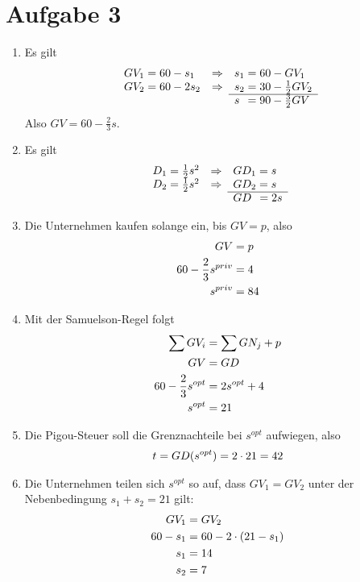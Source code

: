 \documentclass{article}
\begin{document}
	\section*{Aufgabe 3}
	\begin{enumerate}[label=(\alph*)]
		\item Es gilt
		\begin{align}
			\begin{array}{lcl}
				GV_1 = 60-s_1 & \Rightarrow & s_1 = 60-GV_1 \\
				GV_2 = 60-2s_2 & \Rightarrow & s_2 = 30 - \frac{1}{2}GV_2 \\
				\cline{3-3}
				&&s\;\, = 90 - \frac{3}{2}GV
			\end{array} \notag
		\end{align}
		Also $GV = 60 - \frac{2}{3}s$.
		\item Es gilt
		\begin{align}
			\begin{array}{lcl}
				D_1 = \frac{1}{2}s^2 & \Rightarrow & GD_1 = s \\
				D_2 = \frac{1}{2}s^2 & \Rightarrow & GD_2 = s \\
				\cline{3-3}
				&&GD\;\, = 2s
			\end{array} \notag
		\end{align}
		\item Die Unternehmen kaufen solange ein, bis $GV=p$, also
		\begin{align}
			GV &= p \notag \\
			60-\frac{2}{3}s^{priv} &= 4 \notag \\
			s^{priv} &= 84 \notag
		\end{align}
		\item Mit der Samuelson-Regel folgt
		\begin{align}
			\sum GV_i &= \sum GN_j + p \notag \\
			GV &= GD \notag \\
			60-\frac{2}{3}s^{opt} &= 2s^{opt} + 4 \notag \\
			s^{opt} &= 21 \notag
		\end{align}
		\item Die Pigou-Steuer soll die Grenznachteile bei $s^{opt}$ aufwiegen, also
		\begin{align}
			t = GD(s^{opt}) = 2\cdot 21 = 42 \notag
		\end{align}
		\item Die Unternehmen teilen sich $s^{opt}$ so auf, dass $GV_1=GV_2$ unter der Nebenbedingung $s_1+s_2=21$ gilt:
		\begin{align}
			GV_1 &= GV_2 \notag \\
			60-s_1 &= 60-2\cdot (21-s_1) \notag \\
			s_1 &= 14 \notag \\
			s_2 &= 7 \notag
		\end{align}
	\end{enumerate}
\end{document}
